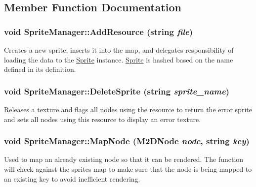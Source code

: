 \subsection{Member Function Documentation}
\hypertarget{classSpriteManager_a62d64bc26902245b617f7e738ce1fe1b}{
\subsubsection[{AddResource}]{\setlength{\rightskip}{0pt plus 5cm}void SpriteManager::AddResource (string {\em file})}}
\label{classSpriteManager_a62d64bc26902245b617f7e738ce1fe1b}
Creates a new sprite, inserts it into the map, and delegates responsibility of loading the data to the \hyperlink{classSprite}{Sprite} instance. \hyperlink{classSprite}{Sprite} is hashed based on the name defined in its definition. \hypertarget{classSpriteManager_a8495b0a9a6de0c8bdd0fe60f46d9e314}{
\subsubsection[{DeleteSprite}]{\setlength{\rightskip}{0pt plus 5cm}void SpriteManager::DeleteSprite (string {\em sprite\_\-name})}}
\label{classSpriteManager_a8495b0a9a6de0c8bdd0fe60f46d9e314}
Releases a texture and flags all nodes using the resource to return the error sprite and sets all nodes using this resource to display an error texture. \hypertarget{classSpriteManager_a34407a9e6ebf2f1eef21050768769d95}{
\subsubsection[{MapNode}]{\setlength{\rightskip}{0pt plus 5cm}void SpriteManager::MapNode (M2DNode {\em node}, \/  string {\em key})}}
\label{classSpriteManager_a34407a9e6ebf2f1eef21050768769d95}
Used to map an already existing node so that it can be rendered. The function will check against the sprites map to make sure that the node is being mapped to an existing key to avoid inefficient rendering. 

